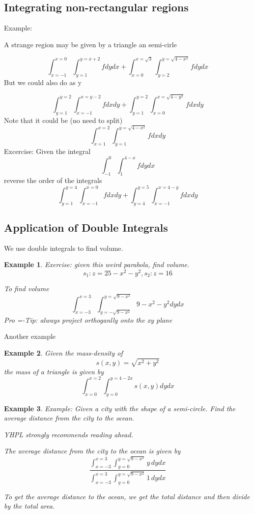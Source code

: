 \documentclass[11pt]{article}
\newtheorem{ex}{Example}
\begin{document}
\subsection{Integrating non-rectangular regions}
Example:

A strange region may be given by a triangle an semi-cirle

\[\int_{x=-1}^{x=0} \int_{y=1}^{y=x+2} f dydx + \int_{x=0}^{x=\sqrt{3}} \int_{y=2}^{y=\sqrt{4-x^2}} f dy dx\]
But we could also do as y

\[\int_{y=1}^{y=2} \int_{x=-1}^{x=y-2} f dx dy + \int_{y=1}^{y=2} \int_{x=0}^{x=\sqrt{4-y^2}} f dx dy\]
Note that it could be (no need to split)
\[\int_{x=1}^{x=2} \int_{y=1}^{y=\sqrt{4-x^2}} f dx dy\]
Excercise:
Given the integral
\[\int_{-1}^0 \int_1^{4-x} f dy dx\]
reverse the order of the integrals
\[\int_{y=1}^{y=4} \int_{x=-1}^{x=0} f dx dy  + \int_{y=4}^{y=5} \int_{x=-1}^{x=4-y} f dx dy\]

\subsection{Application of Double Integrals}
We use double integrals to find volume.
\begin{ex}
Exercise: given this weird parabola, find volume.
\[s_1: z= 25 - x^2 - y^2, s_2: z = 16\]

To find volume
\[\int_{x=-3}^{x=3} \int_{y=-\sqrt{9-x^2}}^{y=\sqrt{9-x^2}} 9 - x^2-y^2 dy dx\]
Pro =-Tip: always project orthoganlly onto the xy plane
\end{ex}

Another example
\begin{ex}
Given the mass-density of
\[s(x,y) = \sqrt{x^2+y^2}\]
the mass of a triangle is given by
\[\int_{x=0}^{x=2} \int_{y=0}^{y=4-2x} s(x,y) dy dx\]
\end{ex}
\begin{ex}
Example:
Given a city with the shape of a semi-circle. Find the average distance
from the city to the ocean.

YHPL strongly recommends reading ahead.

The average distance from the city to the ocean is given by
\[\frac{\int_{x=-3}^{x=3} \int_{y=0}^{y=\sqrt{9-x^2}} y \, dy dx}{\int_{x=-3}^{x=3} \int_{y=0}^{y=\sqrt{9-x^2}} 1 \, dy dx}\]

To get the average distance to the ocean, we get the total distance and
then divide by the total area.
\end{ex}
\end{document}

